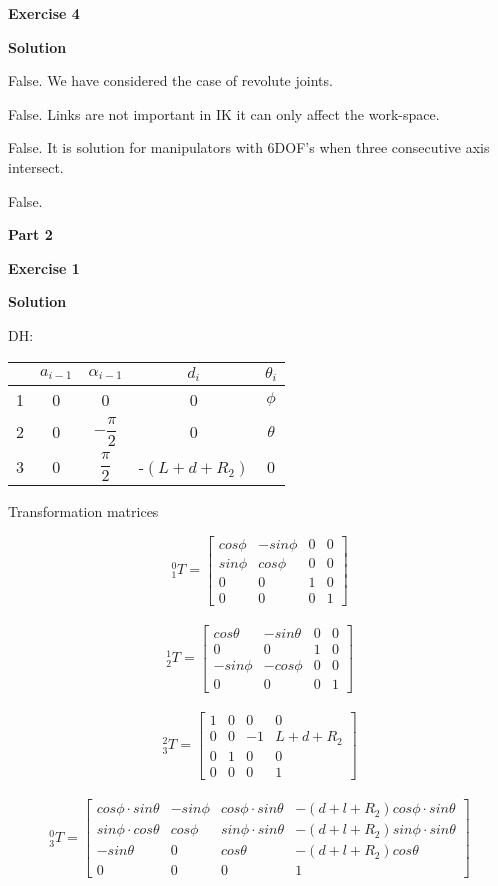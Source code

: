 \documentclass[12pt]{article}
\begin{document}
\textbf{Exercise 4}		
		
\textbf{Solution}

\medskip

\begin{list}{()~}{}
\item False. We have considered the case of revolute joints.
\item False. Links are not important in IK it can only affect the work-space.
\item False. It is solution for manipulators with 6DOF’s when three consecutive axis intersect.
\item False.
\end{list}

\textbf{Part 2}	

\bigskip
	
\textbf{Exercise 1}		
\newpage
		
\textbf{Solution}

DH:
\\
\begin{tabular}{|c|c|c|c|c|}
\hline
 & $a_{i-1}$ & $\alpha_{i-1}$ & $d_i$ & $\theta_i$ \\
 \hline
 1 & 0 & 0 & 0 & $\phi$\\
 \hline
 2 & 0 & $-\dfrac{\pi}{2}$ & 0 & $\theta$\\
 \hline
 3 & 0 & $\dfrac{\pi}{2}$ & -$\left(L+d+R_2\right)$ & 0\\
 \hline
\end{tabular}


Transformation matrices

\[^0_{1}T=\left[
\begin{array}{cccc}
cos\phi & -sin\phi & 0 & 0 \\
sin\phi & cos\phi & 0 & 0 \\
0 & 0 & 1 & 0\\
0 & 0 & 0 & 1
\end{array} \right]\]
\ 
\[^1_{2}T=\left[
\begin{array}{cccc}
cos\theta & -sin\theta & 0 & 0 \\
0 & 0 & 1 & 0\\
-sin\phi & -cos\phi & 0 & 0 \\
0 & 0 & 0 & 1
\end{array} \right]\]
\ 
\[^2_{3}T=\left[
\begin{array}{cccc}
1 & 0 & 0 & 0 \\
0 & 0 & -1 & L+d+R_2\\
0 & 1 & 0 & 0 \\
0 & 0 & 0 & 1
\end{array} \right]\]
\ 
\[^0_{3}T=\left[
\begin{array}{cccc}
cos\phi\cdot sin\theta & -sin\phi & cos\phi\cdot sin\theta & -\left(d+l+R_2\right)cos\phi\cdot sin\theta \\
sin\phi\cdot cos\theta & cos\phi & sin\phi\cdot sin\theta & -\left(d+l+R_2\right)sin\phi\cdot sin\theta\\
-sin\theta & 0 & cos\theta & -\left(d+l+R_2\right)cos\theta \\
0 & 0 & 0 & 1
\end{array} \right]\]
\end{document}
